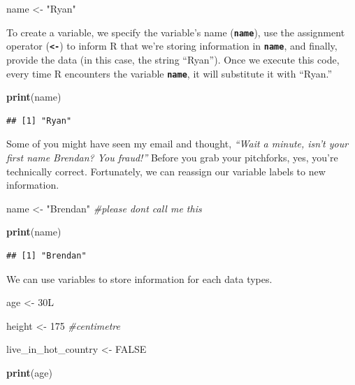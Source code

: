 \documentclass[
]{book}
\newenvironment{Shaded}{\begin{snugshade}}{\end{snugshade}}
\newcommand{\CommentTok}[1]{\textcolor[rgb]{0.56,0.35,0.01}{\textit{#1}}}
\newcommand{\ConstantTok}[1]{\textcolor[rgb]{0.56,0.35,0.01}{#1}}
\newcommand{\DecValTok}[1]{\textcolor[rgb]{0.00,0.00,0.81}{#1}}
\newcommand{\FunctionTok}[1]{\textcolor[rgb]{0.13,0.29,0.53}{\textbf{#1}}}
\newcommand{\NormalTok}[1]{#1}
\newcommand{\OtherTok}[1]{\textcolor[rgb]{0.56,0.35,0.01}{#1}}
\newcommand{\StringTok}[1]{\textcolor[rgb]{0.31,0.60,0.02}{#1}}
\begin{document}
\begin{Shaded}
\begin{Highlighting}[]
\NormalTok{name }\OtherTok{\textless{}{-}} \StringTok{"Ryan"}
\end{Highlighting}
\end{Shaded}

To create a variable, we specify the variable's name (\textbf{\texttt{name}}), use the assignment operator (\textbf{\texttt{\textless{}-}}) to inform R that we're storing information in \textbf{\texttt{name}}, and finally, provide the data (in this case, the string ``Ryan''). Once we execute this code, every time R encounters the variable \textbf{\texttt{name}}, it will substitute it with ``Ryan.''

\begin{Shaded}
\begin{Highlighting}[]
\FunctionTok{print}\NormalTok{(name)}
\end{Highlighting}
\end{Shaded}

\begin{verbatim}
## [1] "Ryan"
\end{verbatim}

Some of you might have seen my email and thought, \emph{``Wait a minute, isn't your first name Brendan? You fraud!''} Before you grab your pitchforks, yes, you're technically correct. Fortunately, we can reassign our variable labels to new information.

\begin{Shaded}
\begin{Highlighting}[]
\NormalTok{name }\OtherTok{\textless{}{-}} \StringTok{"Brendan"} \CommentTok{\#please don\textquotesingle{}t call me this}

\FunctionTok{print}\NormalTok{(name)}
\end{Highlighting}
\end{Shaded}

\begin{verbatim}
## [1] "Brendan"
\end{verbatim}

We can use variables to store information for each data types.

\begin{Shaded}
\begin{Highlighting}[]
\NormalTok{age }\OtherTok{\textless{}{-}}\NormalTok{ 30L}

\NormalTok{height }\OtherTok{\textless{}{-}} \DecValTok{175} \CommentTok{\#centimetre }

\NormalTok{live\_in\_hot\_country }\OtherTok{\textless{}{-}} \ConstantTok{FALSE}

\FunctionTok{print}\NormalTok{(age)}
\end{Highlighting}
\end{Shaded}
\end{document}
